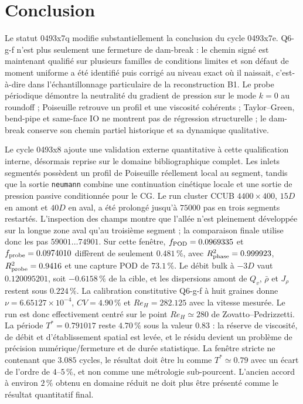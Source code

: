 \documentclass[11pt,a4paper]{article}
\begin{document}
\section{Conclusion}

Le statut 0493x7q modifie substantiellement la conclusion du cycle 0493x7e. Q6-g-f n'est plus seulement une fermeture de dam-break : le chemin signé est maintenant qualifié sur plusieurs familles de conditions limites et son défaut de moment uniforme a été identifié puis corrigé au niveau exact où il naissait, c'est-à-dire dans l'échantillonnage particulaire de la reconstruction B1. Le probe périodique démontre la neutralité du gradient de pression sur le mode $k=0$ au roundoff ; Poiseuille retrouve un profil et une viscosité cohérents ; Taylor--Green, bend-pipe et same-face IO ne montrent pas de régression structurelle ; le dam-break conserve son chemin partiel historique et sa dynamique qualitative.


Le cycle 0493x8 ajoute une validation externe quantitative à cette qualification interne, désormais reprise sur le domaine bibliographique complet. Les inlets segmentés possèdent un profil de Poiseuille réellement local au segment, tandis que la sortie \texttt{neumann} combine une continuation cinétique locale et une sortie de pression passive conditionnée pour le CG. Le run cluster CCUB $4400\times400$, $15D$ en amont et $40D$ en aval, a été prolongé jusqu'à $75000$ pas en trois segments restartés. L'inspection des champs montre que l'allée n'est pleinement développée sur la longue zone aval qu'au troisième segment ; la comparaison finale utilise donc les pas $59001\ldots74901$. Sur cette fenêtre, $f_{\rm POD}=0.0969335$ et $f_{\rm probe}=0.0974010$ diffèrent de seulement $0.481\,\%$, avec $R^2_{\rm phase}=0.999923$, $R^2_{\rm probe}=0.9416$ et une capture POD de $73.1\,\%$. Le débit bulk à $-3D$ vaut $0.120095201$, soit $-0.6158\,\%$ de la cible, et les dispersions amont de $Q_v$, $\bar\rho$ et $J_\rho$ restent sous $0.224\,\%$. La calibration constitutive Q6-g-f à huit graines donne $\nu=6.65127\times10^{-4}$, $CV=4.90\,\%$ et $Re_H=282.125$ avec la vitesse mesurée. Le run est donc effectivement centré sur le point $Re_H\simeq280$ de Zovatto--Pedrizzetti. La période $T^*=0.791017$ reste $4.70\,\%$ sous la valeur $0.83$ : la réserve de viscosité, de débit et d'établissement spatial est levée, et le résidu devient un problème de précision numérique/fermeture et de durée statistique. La fenêtre stricte ne contenant que $3.085$ cycles, le résultat doit être lu comme $T^*\simeq0.79$ avec un écart de l'ordre de $4$--$5\,\%$, et non comme une métrologie sub-pourcent. L'ancien accord à environ $2\,\%$ obtenu en domaine réduit ne doit plus être présenté comme le résultat quantitatif final.
\end{document}
